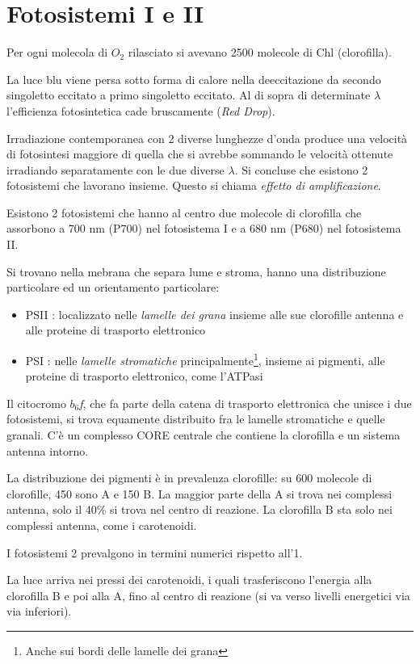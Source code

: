 \documentclass[a4paper,12pt]{book}
\begin{document}
\section{Fotosistemi I e II}
Per ogni molecola di $O_2$ rilasciato si avevano 2500 molecole di Chl (clorofilla).

La luce blu viene persa sotto forma di calore nella deeccitazione da secondo singoletto eccitato a primo singoletto eccitato. Al di sopra di determinate $\lambda$ l'efficienza fotosintetica cade bruscamente (\emph{Red Drop}).

Irradiazione contemporanea con 2 diverse lunghezze d'onda produce una velocità di fotosintesi maggiore di quella che si avrebbe sommando le velocità ottenute irradiando separatamente con le due diverse $\lambda$. Si concluse che esistono 2 fotosistemi che lavorano insieme. Questo si chiama \emph{effetto di amplificazione}.

Esistono 2 fotosistemi che hanno al centro due molecole di clorofilla che assorbono a 700 nm (P700) nel fotosistema I e a 680 nm (P680) nel fotosistema II.

Si trovano nella mebrana che separa lume e stroma, hanno una distribuzione particolare ed un orientamento particolare:
\begin{itemize}
\item{PSII : localizzato nelle \emph{lamelle dei grana} insieme alle sue clorofille antenna e alle proteine di trasporto elettronico}
\item{PSI : nelle \emph{lamelle stromatiche} principalmente\footnote{Anche sui bordi delle lamelle dei grana}, insieme ai pigmenti, alle proteine di trasporto elettronico, come l'ATPasi}
\end{itemize}

Il citocromo \emph{$b_{6}$f}, che fa parte della catena di trasporto elettronica che unisce i due fotosistemi, si trova equamente distribuito fra le lamelle stromatiche e quelle granali.
C'è un complesso CORE centrale che contiene la clorofilla e un sistema antenna intorno.

La distribuzione dei pigmenti è in prevalenza clorofille: su 600 molecole di clorofille, 450 sono A e 150 B. La maggior parte della A si trova nei complessi antenna, solo il 40\% si trova nel centro di reazione.
La clorofilla B sta solo nei complessi antenna, come i carotenoidi.

I fotosistemi 2 prevalgono in termini numerici rispetto all'1.

La luce arriva nei pressi dei carotenoidi, i quali trasferiscono l'energia alla clorofilla B e poi alla A, fino al centro di reazione (si va verso livelli energetici via via inferiori).
\end{document}
